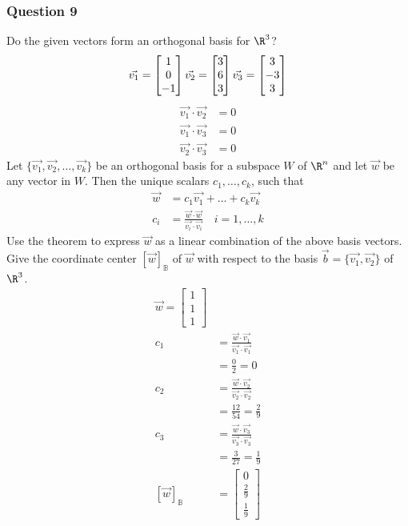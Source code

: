\documentclass{math}
\begin{document}
\subsubsection*{Question 9}
Do the given vectors form an orthogonal basis for \( \R^3 \)?
\[ \vec{v_1} = \begin{bmatrix}1 \\ 0 \\ -1\end{bmatrix} \\
  \vec{v_2} = \begin{bmatrix}3 \\ 6 \\ 3\end{bmatrix} \\
  \vec{v_3} = \begin{bmatrix}3 \\ -3 \\ 3\end{bmatrix} \]
\begin{align*}
  \vec{v_1}\cdot\vec{v_2} &= 0 \\
  \vec{v_1}\cdot\vec{v_3} &= 0 \\
  \vec{v_2}\cdot\vec{v_3} &= 0
\end{align*}
Let \( \{\vec{v_1},\vec{v_2},\dots,\vec{v_k}\} \) be an orthogonal basis for a
subspace \( W \) of \( \R^n \) and let \( \vec{w} \) be any vector in \( W \).
Then the unique scalars \( c_1,\dots,c_k \), such that
\begin{align*}
  \vec{w} &= c_1\vec{v_1}+\dots+c_k\vec{v_k} \\
  c_i &= \frac{\vec{w}\cdot\vec{w}}{\vec{v_i}\cdot\vec{v_i}} \quad
    i = 1,\dots,k
\end{align*}
Use the theorem to express \( \vec{w} \) as a linear combination of the above
basis vectors. Give the coordinate center \( [\vec{w}]_{\mathbb{B}} \) of
\( \vec{w} \) with respect to the basis \( \vec{b} = \{\vec{v_1},\vec{v_2}\} \)
of \( \R^3 \).
\begin{align*}
  \vec{w} = \begin{bmatrix}1 \\ 1 \\ 1\end{bmatrix} \\
  c_1 &= \frac{\vec{w}\cdot\vec{v_1}}{\vec{v_1}\cdot\vec{v_1}} \\
  &= \frac{0}{2} = 0 \\
  c_2 &= \frac{\vec{w}\cdot\vec{v_2}}{\vec{v_2}\cdot\vec{v_2}} \\
  &= \frac{12}{54} = \frac{2}{9} \\
  c_3 &= \frac{\vec{w}\cdot\vec{v_3}}{\vec{v_3}\cdot\vec{v_3}} \\
  &= \frac{3}{27} = \frac{1}{9} \\
  [\vec{w}]_{\mathbb{B}} &= \begin{bmatrix}
    0 \\ \frac{2}{9} \\ \frac{1}{9}
  \end{bmatrix}
\end{align*}
\end{document}
